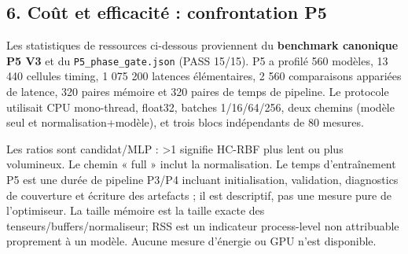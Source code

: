 \documentclass[
]{article}
\begin{document}
\subsection{6. Coût et efficacité : confrontation
P5}\label{couxfbt-et-efficacituxe9-confrontation-p5}

Les statistiques de ressources ci-dessous proviennent du
\textbf{benchmark canonique P5 V3} et du \texttt{P5\_phase\_gate.json}
(PASS 15/15). P5 a profilé 560 modèles, 13 440 cellules timing, 1 075
200 latences élémentaires, 2 560 comparaisons appariées de latence, 320
paires mémoire et 320 paires de temps de pipeline. Le protocole
utilisait CPU mono-thread, float32, batches 1/16/64/256, deux chemins
(modèle seul et normalisation+modèle), et trois blocs indépendants de 80
mesures.

Les ratios sont candidat/MLP : \textgreater1 signifie HC-RBF plus lent
ou plus volumineux. Le chemin « full » inclut la normalisation. Le temps
d'entraînement P5 est une durée de pipeline P3/P4 incluant
initialisation, validation, diagnostics de couverture et écriture des
artefacts ; il est descriptif, pas une mesure pure de l'optimiseur. La
taille mémoire est la taille exacte des tenseurs/buffers/normaliseur;
RSS est un indicateur process-level non attribuable proprement à un
modèle. Aucune mesure d'énergie ou GPU n'est disponible.
\end{document}
